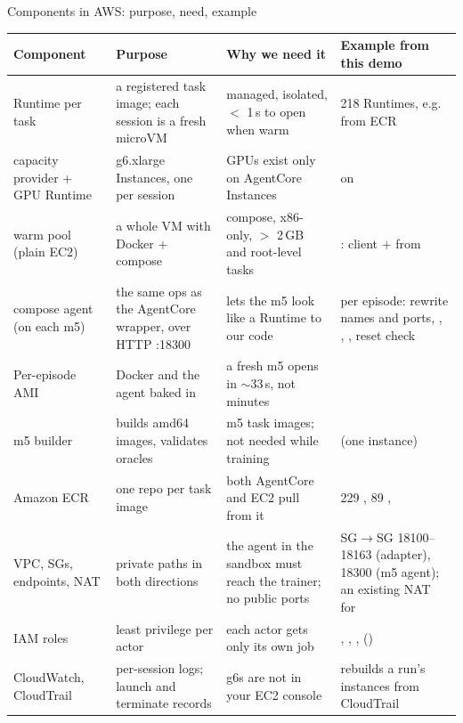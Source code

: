\begin{frame}{Components in AWS: purpose, need, example}
\tiny\setlength{\tabcolsep}{3pt}
\begin{tabularx}{\textwidth}{@{}P{0.17\textwidth}P{0.24\textwidth}P{0.24\textwidth}Y@{}}
\toprule
\textbf{Component} & \textbf{Purpose} & \textbf{Why we need it} & \textbf{Example from this demo}\\
\midrule
\smv{} Runtime per task & a registered task image; each session is a fresh microVM & managed, isolated, $<$ 1\,s to open when warm & 218 Runtimes, e.g.\  from ECR \\
\sg{} capacity provider + GPU Runtime & g6.xlarge Instances, one per session & GPUs exist only on AgentCore Instances &  on \\
\sm{} warm pool (plain EC2) & a whole VM with Docker + compose & compose, x86-only, $>$ 2\,GB and root-level tasks & : client +  from \\
compose agent (on each m5) & the same ops as the AgentCore wrapper, over HTTP :18300 & lets the m5 look like a Runtime to our code & per episode: rewrite names and ports, , , , reset check\\
Per-episode AMI & Docker and the agent baked in & a fresh m5 opens in $\sim$33\,s, not minutes & \\
m5 builder & builds amd64 images, validates oracles & m5 task images; not needed while training &  (one instance)\\
Amazon ECR & one repo per task image & both AgentCore and EC2 pull from it & 229 , 89 , \\
VPC, SGs, endpoints, NAT & private paths in both directions & the agent in the sandbox must reach the trainer; no public ports & SG$\rightarrow$SG 18100--18163 (adapter), 18300 (m5 agent); an existing NAT for \\
IAM roles & least privilege per actor & each actor gets only its own job & , , ,  ()\\
CloudWatch, CloudTrail & per-session logs; launch and terminate records & g6s are not in your EC2 console &  rebuilds a run's instances from CloudTrail\\
\bottomrule
\end{tabularx}
\end{frame}

